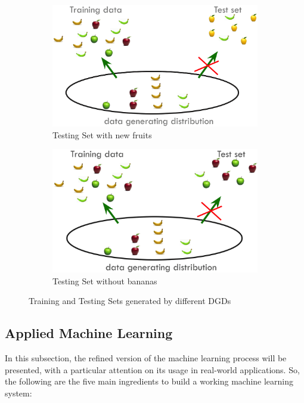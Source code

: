 \begin{figure}[h]
      \begin{subfigure}{0.45\textwidth}
            \centering
            \includegraphics[width=\textwidth]{../img/DGD_counterexample_1}
            \caption{Testing Set with new fruits}
      \end{subfigure}
      \hfill
      \begin{subfigure}{0.45\textwidth}
            \centering
            \includegraphics[width=\textwidth]{../img/DGD_counterexample_2}
            \caption{Testing Set without bananas}
      \end{subfigure}
      \caption{Training and Testing Sets generated by different DGDs}
\end{figure}

\subsection{Applied Machine Learning}

In this subsection, the refined version of the machine learning process
will be presented, with a particular attention on its usage in real-world
applications. So, the following are the five main ingredients to build a
working machine learning system:

